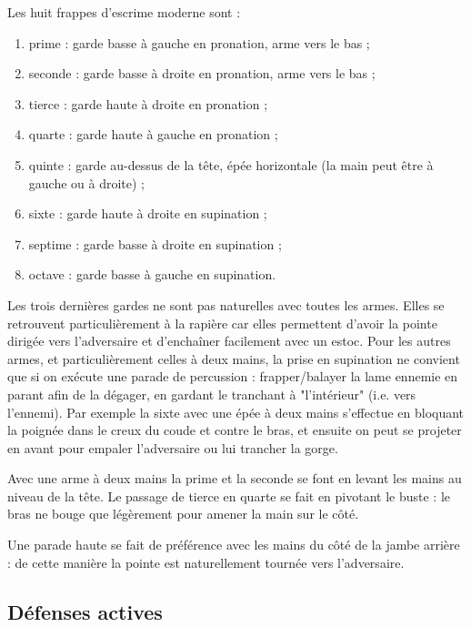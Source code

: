 \begin{garde}
\label{att:garde:escrime-moderne}

\noindent
Les huit frappes d'escrime moderne sont :
\begin{enumerate}
	\item prime : garde basse à gauche en pronation, arme vers le bas ;
	\item seconde : garde basse à droite en pronation, arme vers le bas ;
	\item tierce : garde haute à droite en pronation ;
	\item quarte : garde haute à gauche en pronation ;
	\item quinte : garde au-dessus de la tête, épée horizontale (la main peut être à gauche ou à droite) ;
	\item sixte : garde haute à droite en supination ;
	\item septime : garde basse à droite en supination ;
	\item octave : garde basse à gauche en supination.
\end{enumerate}
\end{garde}


Les trois dernières gardes ne sont pas naturelles avec toutes les armes.
Elles se retrouvent particulièrement à la rapière car elles permettent d'avoir la pointe dirigée vers l'adversaire et d'enchaîner facilement avec un estoc.
Pour les autres armes, et particulièrement celles à deux mains, la prise en supination ne convient que si on exécute une parade de percussion : frapper/balayer la lame ennemie en parant afin de la dégager, en gardant le tranchant à "l'intérieur" (i.e. vers l'ennemi).
Par exemple la sixte avec une épée à deux mains s'effectue en bloquant la poignée dans le creux du coude et contre le bras, et ensuite on peut se projeter en avant pour empaler l'adversaire ou lui trancher la gorge.

Avec une arme à deux mains la prime et la seconde se font en levant les mains au niveau de la tête.
Le passage de tierce en quarte se fait en pivotant le buste : le bras ne bouge que légèrement pour amener la main sur le côté.

Une parade haute se fait de préférence avec les mains du côté de la jambe arrière : de cette manière la pointe est naturellement tournée vers l'adversaire.


\subsection{Défenses actives}


